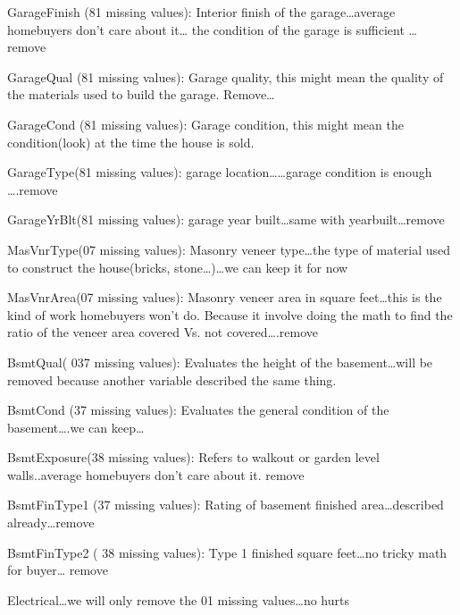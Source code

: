 \documentclass[
]{article}
\begin{document}
GarageFinish (81 missing values): Interior finish of the
garage\ldots average homebuyers don't care about it\ldots{} the
condition of the garage is sufficient \ldots{} remove

GarageQual (81 missing values): Garage quality, this might mean the
quality of the materials used to build the garage. Remove\ldots{}

GarageCond (81 missing values): Garage condition, this might mean the
condition(look) at the time the house is sold.

GarageType(81 missing values): garage location\ldots\ldots garage
condition is enough \ldots.remove

GarageYrBlt(81 missing values): garage year built\ldots same with
yearbuilt\ldots remove

MasVnrType(07 missing values): Masonry veneer type\ldots the type of
material used to construct the house(bricks, stone\ldots)\ldots we can
keep it for now

MasVnrArea(07 missing values): Masonry veneer area in square
feet\ldots this is the kind of work homebuyers won't do. Because it
involve doing the math to find the ratio of the veneer area covered Vs.
not covered\ldots.remove

BsmtQual( 037 missing values): Evaluates the height of the
basement\ldots will be removed because another variable described the
same thing.

BsmtCond (37 missing values): Evaluates the general condition of the
basement\ldots.we can keep\ldots{}

BsmtExposure(38 missing values): Refers to walkout or garden level
walls..average homebuyers don't care about it. remove

BsmtFinType1 (37 missing values): Rating of basement finished
area\ldots described already\ldots remove

BsmtFinType2 ( 38 missing values): Type 1 finished square feet\ldots no
tricky math for buyer\ldots{} remove

Electrical\ldots we will only remove the 01 missing values\ldots no
hurts
\end{document}
